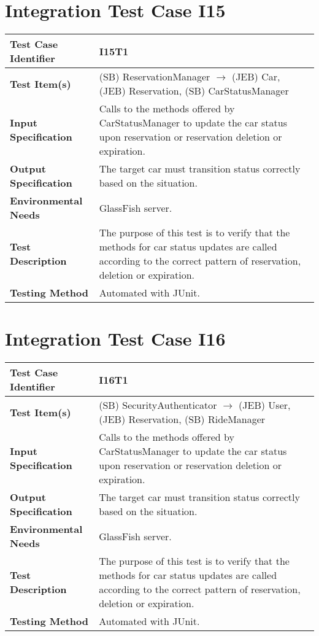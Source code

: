 \section{Integration Test Case I15}

\begin{longtable}{p{} | p{}}
\textbf{Test Case Identifier} & I15T1\\
\hline
\textbf{Test Item(s)} & (SB) ReservationManager $\rightarrow$ (JEB) Car, (JEB) Reservation, (SB) CarStatusManager \\
\hline
\textbf{Input Specification} & Calls to the methods offered by CarStatusManager to update the car status upon reservation or reservation deletion or expiration. \\
\hline
\textbf{Output Specification} & The target car must transition status correctly based on the situation. \\
\hline
\textbf{Environmental Needs} & GlassFish server. \\
\hline
\textbf{Test Description} & The purpose of this test is to verify that the methods for car status updates are called according to the correct pattern of reservation, deletion or expiration. \\
\hline
\textbf{Testing Method} & Automated with JUnit. \\
\hline
\end{longtable}

\section{Integration Test Case I16}

\begin{longtable}{p{} | p{}}
\textbf{Test Case Identifier} & I16T1\\
\hline
\textbf{Test Item(s)} & (SB) SecurityAuthenticator $\rightarrow$ (JEB) User, (JEB) Reservation, (SB) RideManager \\
\hline
\textbf{Input Specification} & Calls to the methods offered by CarStatusManager to update the car status upon reservation or reservation deletion or expiration. \\
\hline
\textbf{Output Specification} & The target car must transition status correctly based on the situation. \\
\hline
\textbf{Environmental Needs} & GlassFish server. \\
\hline
\textbf{Test Description} & The purpose of this test is to verify that the methods for car status updates are called according to the correct pattern of reservation, deletion or expiration. \\
\hline
\textbf{Testing Method} & Automated with JUnit. \\
\hline
\end{longtable}

